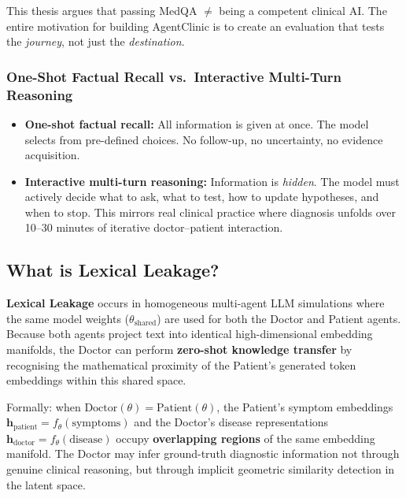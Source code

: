 \begin{mattersbox}[\textcolor{white}{Why It Matters for This Thesis}]
This thesis argues that passing MedQA $\neq$ being a competent clinical AI. The entire motivation for building AgentClinic is to create an evaluation that tests the \textit{journey}, not just the \textit{destination}.
\end{mattersbox}

\subsubsection{One-Shot Factual Recall vs.\ Interactive Multi-Turn Reasoning}

\begin{itemize}[leftmargin=1.5cm]
    \item \textbf{One-shot factual recall:} All information is given at once. The model selects from pre-defined choices. No follow-up, no uncertainty, no evidence acquisition.
    \item \textbf{Interactive multi-turn reasoning:} Information is \textit{hidden}. The model must actively decide what to ask, what to test, how to update hypotheses, and when to stop. This mirrors real clinical practice where diagnosis unfolds over 10--30 minutes of iterative doctor--patient interaction.
\end{itemize}

\subsection{What is Lexical Leakage?}

\begin{acadbox}[\textcolor{white}{Academic Definition}]
\textbf{Lexical Leakage} occurs in homogeneous multi-agent LLM simulations where the same model weights ($\theta_{\text{shared}}$) are used for both the Doctor and Patient agents. Because both agents project text into identical high-dimensional embedding manifolds, the Doctor can perform \textbf{zero-shot knowledge transfer} by recognising the mathematical proximity of the Patient's generated token embeddings within this shared space.

Formally: when $\text{Doctor}(\theta) = \text{Patient}(\theta)$, the Patient's symptom embeddings $\mathbf{h}_{\text{patient}} = f_\theta(\text{symptoms})$ and the Doctor's disease representations $\mathbf{h}_{\text{doctor}} = f_\theta(\text{disease})$ occupy \textbf{overlapping regions} of the same embedding manifold. The Doctor may infer ground-truth diagnostic information not through genuine clinical reasoning, but through implicit geometric similarity detection in the latent space.
\end{acadbox}

